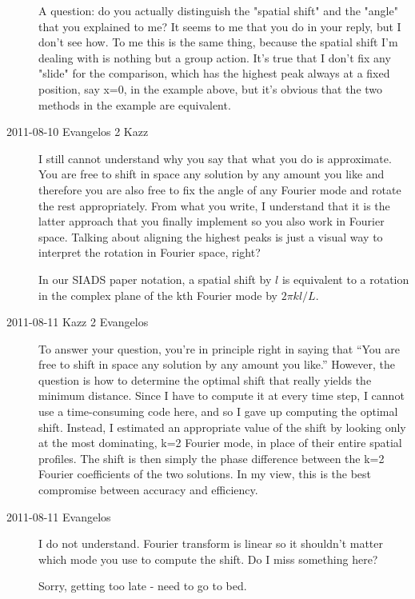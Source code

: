 \begin{description}
A question: do you actually distinguish the "spatial shift" and the "angle"
that you explained to me? It seems to me that you do in your reply, but
I don't see how. To me this is the same thing, because the spatial shift
I'm dealing with is nothing but a  group action. It's true that
I don't fix any "slide" for the comparison, which has the highest peak
always at a fixed position, say x=0, in the example above, but it's obvious
that the two methods in the example are equivalent.

\item[2011-08-10 Evangelos 2 Kazz] I still cannot understand why you say that
what you do is approximate.
You are free to shift in space any solution by any amount you like and
therefore you are also free to fix the angle of any Fourier mode and
rotate the rest appropriately. From what you write, I understand that
it is the latter approach that you finally implement so you also work
in Fourier space. Talking about aligning the highest peaks is just a
visual way to interpret the rotation in Fourier space, right?

In our SIADS paper notation, a spatial shift by $l$ is equivalent to a
rotation in the complex plane of the kth Fourier mode by $2\pi k l /L$.

\item[2011-08-11 Kazz 2 Evangelos] To answer your question, you're in principle
right in saying that
``You are free to shift in space any solution by any amount you like.''
However, the question is how to determine the optimal shift that really yields
the minimum distance. Since I have to compute it at every time step,
I cannot use a time-consuming code here, and so I gave up computing the
optimal shift. Instead, I estimated an appropriate value of the shift by
looking only at the most dominating, k=2 Fourier mode, in place of their
entire spatial profiles. The shift is then simply the phase difference
between the k=2 Fourier coefficients of the two solutions.
In my view, this is the best compromise between accuracy and efficiency.

\item[2011-08-11 Evangelos] I do not understand. Fourier transform is
linear so it shouldn't matter which mode you use to compute the shift.
Do I miss something here?



Sorry, getting too late - need to go to bed.
\end{description}
